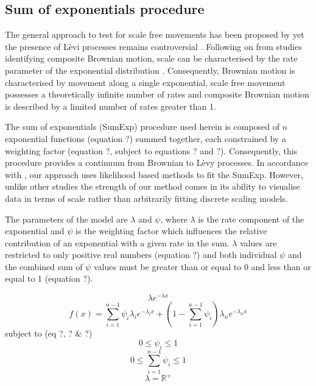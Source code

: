 \documentclass[11pt,usenames,dvipsnames,a4paper]{article}
\begin{document}
\subsection{Sum of exponentials procedure}

\begin{linenumbers}
\hspace{\parindent}
The general approach to test for scale free movements has been proposed by \cite{Murphy2007} yet the presence of L\`evi processes remains controversial \citep{Pyke2015}. Following on from studies identifying composite Brownian motion, scale can be characterised by the rate parameter of the exponential distribution \citep{Petrovskii2011}. Consequently, Brownian motion is characterised by movement along a single exponential, scale free movement possesses a theoretically infinite number of rates and composite Brownian motion is described by a limited number of rates greater than 1. 

The sum of exponentials (SumExp) procedure used herein is composed of $n$ exponential functions (equation ?) summed together, each constrained by a weighting factor (equation ?, subject to equations ? and ?). Consequently, this procedure provides a continuum from Brownian to L\`evy processes. In accordance with \cite{Murphy2007}, our approach uses likelihood based methods to fit the SumExp. However, unlike other studies \citep{Petrovskii2011, Sakamoto2017, Gautestad2012, Zhao2016} the strength of our method comes in its ability to visualise data in terms of scale rather than arbitrarily fitting discrete scaling models.

The parameters of the model are $\lambda$ and $\psi$, where $\lambda$ is the rate component of the exponential and $\psi$ is the weighting factor which influences the relative contribution of an exponential with a given rate in the sum. $\lambda$ values are restricted to only positive real numbers (equation ?) and both individual $\psi$ and the combined sum of $\psi$ values must be greater than or equal to 0 and less than or equal to 1 (equation ?).
\end{linenumbers}

\begin{equation}
\lambda e^{-\lambda x}
\end{equation}
\begin{equation}
f(x) = \sum_{i=1}^{n-1} \psi_i \lambda_i e^{-\lambda_i x} + \left(1 - \sum_{i=1}^{n-1}\psi_i\right) \lambda_n e^{-\lambda_n x}
\end{equation}
subject to (eq ?, ? \& ?)
\begin{equation}
0\leq \psi_i \leq 1
\end{equation}
\begin{equation}
0\leq \sum_{i=1}^{n-1}\psi_i \leq 1
\end{equation}
\begin{equation}
\lambda = \mathbb{R}^+
\end{equation}
\end{document}
